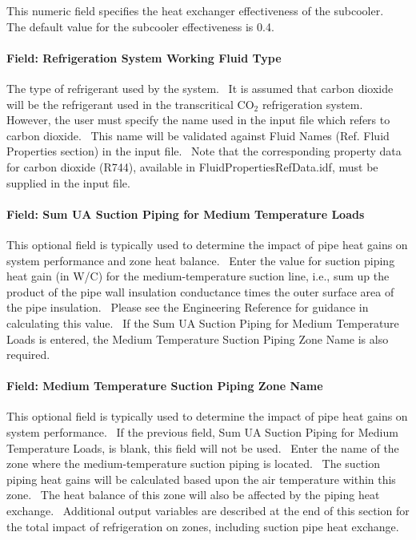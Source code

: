 This numeric field specifies the heat exchanger effectiveness of the subcooler.~ The default value for the subcooler effectiveness is 0.4.

\paragraph{Field: Refrigeration System Working Fluid Type}\label{field-refrigeration-system-working-fluid-type-1}

The type of refrigerant used by the system.~ It is assumed that carbon dioxide will be the refrigerant used in the transcritical CO\(_{2}\) refrigeration system.~ However, the user must specify the name used in the input file which refers to carbon dioxide.~ This name will be validated against Fluid Names (Ref. Fluid Properties section) in the input file.~ Note that the corresponding property data for carbon dioxide (R744), available in FluidPropertiesRefData.idf, must be supplied in the input file.

\paragraph{Field: Sum UA Suction Piping for Medium Temperature Loads}\label{field-sum-ua-suction-piping-for-medium-temperature-loads}

This optional field is typically used to determine the impact of pipe heat gains on system performance and zone heat balance.~ Enter the value for suction piping heat gain (in W/C) for the medium-temperature suction line, i.e., sum up the product of the pipe wall insulation conductance times the outer surface area of the pipe insulation.~ Please see the Engineering Reference for guidance in calculating this value.~ If the Sum UA Suction Piping for Medium Temperature Loads is entered, the Medium Temperature Suction Piping Zone Name is also required.

\paragraph{Field: Medium Temperature Suction Piping Zone Name}\label{field-medium-temperature-suction-piping-zone-name}

This optional field is typically used to determine the impact of pipe heat gains on system performance.~ If the previous field, Sum UA Suction Piping for Medium Temperature Loads, is blank, this field will not be used.~ Enter the name of the zone where the medium-temperature suction piping is located.~ The suction piping heat gains will be calculated based upon the air temperature within this zone.~ The heat balance of this zone will also be affected by the piping heat exchange.~ Additional output variables are described at the end of this section for the total impact of refrigeration on zones, including suction pipe heat exchange.

